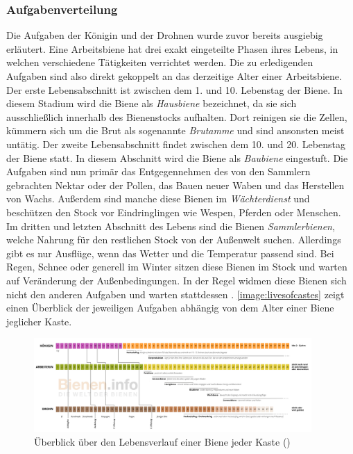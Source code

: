\subsubsection{Aufgabenverteilung}
Die Aufgaben der Königin und der Drohnen wurde zuvor bereits ausgiebig erläutert.
Eine Arbeitsbiene hat drei exakt eingeteilte Phasen ihres Lebens, in welchen verschiedene Tätigkeiten verrichtet werden. Die zu erledigenden Aufgaben sind also direkt gekoppelt an das derzeitige Alter einer Arbeitsbiene. Der erste Lebensabschnitt ist zwischen dem 1. und 10. Lebenstag der Biene. In diesem Stadium wird die Biene als \textit{Hausbiene} bezeichnet, da sie sich 
ausschließlich innerhalb des Bienenstocks aufhalten. Dort reinigen sie die Zellen, kümmern sich um die Brut als sogenannte \textit{Brutamme} und sind ansonsten meist untätig. Der zweite Lebensabschnitt findet zwischen dem 10. und 20. Lebenstag der Biene statt. In diesem Abschnitt wird die Biene als \textit{Baubiene} eingestuft. Die Aufgaben sind nun primär das Entgegennehmen des von den Sammlern gebrachten Nektar oder der Pollen, das Bauen neuer Waben und das Herstellen von Wachs. Außerdem sind manche diese Bienen im \textit{Wächterdienst} und beschützen den Stock vor Eindringlingen wie Wespen, Pferden oder Menschen. Im dritten und letzten Abschnitt des Lebens sind die Bienen \textit{Sammlerbienen}, welche Nahrung für den restlichen Stock von der Außenwelt suchen. Allerdings gibt es nur Ausflüge, wenn das Wetter und die Temperatur passend sind. Bei Regen, Schnee oder generell im Winter sitzen diese Bienen im Stock und warten auf Veränderung der Außenbedingungen. In der Regel widmen diese Bienen sich nicht den anderen Aufgaben und warten stattdessen \cite*[S.42-44]{bees:frisch}. \autoref{image:livesofcastes} zeigt einen Überblick der jeweiligen Aufgaben abhängig von dem Alter einer Biene jeglicher Kaste.

\begin{figure}
    \begin{center}
        \includegraphics[width=400px]{0.bilder/livesofcastes.png}
    \end{center}
    \caption{Überblick über den Lebensverlauf einer Biene jeder Kaste (\cite[]{bees:lifeexpectancy})} \label{image:livesofcastes}
\end{figure}


